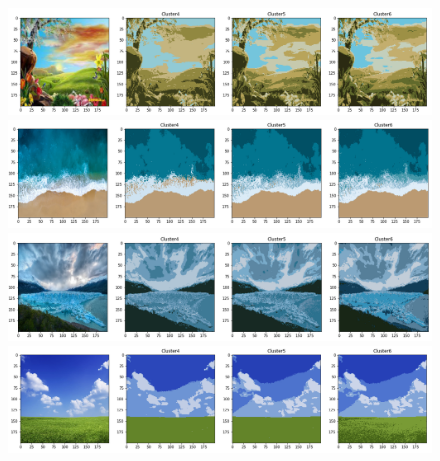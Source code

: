\documentclass{article}
\begin{document}
\newpage

\begin{figure}[h!]
\centerline{\includegraphics[scale=0.45]{images/segmented_fuzzy_c_means7.png}}
\centerline{\includegraphics[scale=0.45]{images/segmented_fuzzy_c_means8.png}}
\centerline{\includegraphics[scale=0.45]{images/segmented_fuzzy_c_means5.png}}
\centerline{\includegraphics[scale=0.45]{images/segmented_fuzzy_c_means4.png}}
\end{figure}

\newpage
\end{document}
